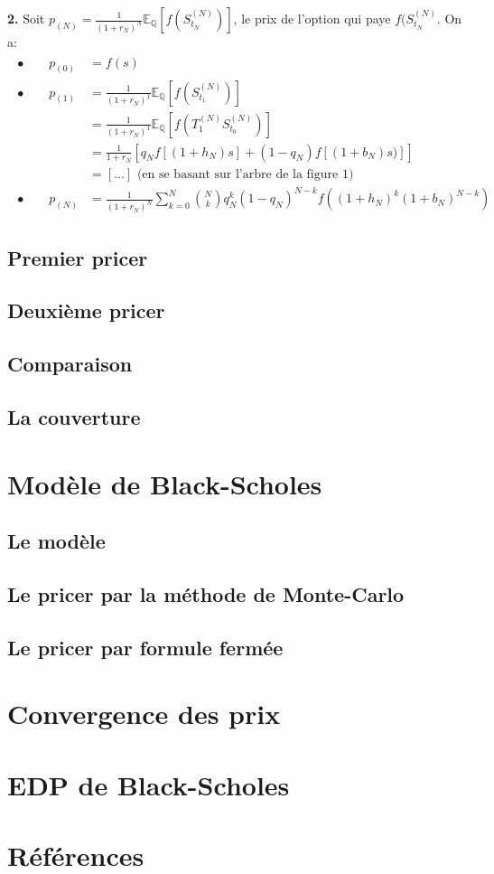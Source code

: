 \documentclass[10pt]{article}
\begin{document}
		\textbf{2.} Soit \(   p_(N) = \frac{1}{(1 + r_N)^N} \mathbb{E}_{\mathbb{Q}}[f(S^{(N)}_{t_N})]   \),
		le prix de l'option qui paye \( f(S^{(N)}_{t_N} \). On a:
		\begin{align}
			\begin{split}
				\bullet \qquad p_{(0)} 	&= f(s) \\
				\bullet \qquad p_{(1)} 	&= \frac{1}{(1 + r_N)^1} \mathbb{E}_{\mathbb{Q}}[f(S^{(N)}_{t_1})] \\
										&= \frac{1}{(1 + r_N)^1} \mathbb{E}_{\mathbb{Q}}[f(T^{(N)}_{1} S^{(N)}_{t_0})] \\
										&= \frac{1}{1 + r_N} [ q_N f[(1 + h_N)  s] + (1 - q_N) f[(1 + b_N)  s)] ] \\
										&= [...] \text{ (en se basant sur l'arbre de la figure 1)}\\
				\bullet \qquad p_{(N)} 	&= \frac{1}{(1 + r_N)^N} \sum^{N}_{k = 0} {N\choose k} q_N^k (1 - q_N)^{N - k} f((1 + h_N)^k (1 + b_N)^{N - k})
			\end{split}
		\end{align}
	
		\subsection{Premier pricer}
		\subsection{Deuxième pricer}
		\subsection{Comparaison}
		\subsection{La couverture}
		
	\section{Modèle de Black-Scholes}
		\subsection{Le modèle}
		\subsection{Le pricer par la méthode de Monte-Carlo}
		\subsection{Le pricer par formule fermée}
		
	\section{Convergence des prix}
	
	\section{EDP de Black-Scholes}
		
	\newpage
	\section{Références}
		\begin{thebibliography}{}
		\end{thebibliography}
\end{document}
